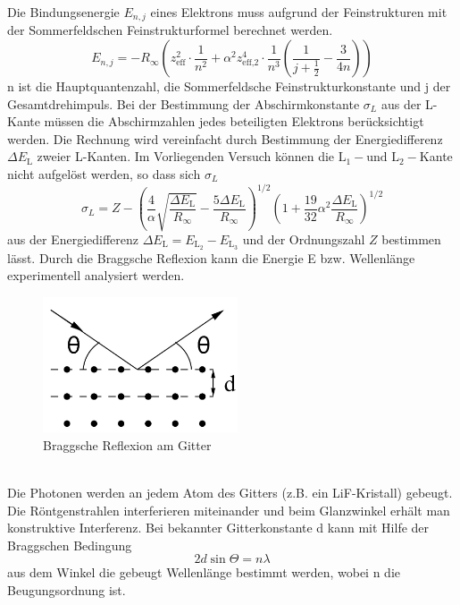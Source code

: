 \noindent
Die Bindungsenergie $E_{n,j}$ eines Elektrons muss aufgrund der Feinstrukturen mit der Sommerfeldschen Feinstrukturformel berechnet werden.
\begin{equation}
    E_{n,j} = -R_{\infty}\left(z_{\text{eff}}^2 \cdot \frac{1}{n^2} + \alpha^2 z_{\text{eff,2}}^4 \cdot \frac{1}{n^3} \left( \frac{1}{j + \frac{1}{2}} - \frac{3}{4n}\right)\right)
    \label{eqn:gl3}
\end{equation}
n ist die Hauptquantenzahl, \alpha die Sommerfeldsche Feinstrukturkonstante und j der Gesamtdrehimpuls.
Bei der Bestimmung der Abschirmkonstante ${\sigma}_L$ aus der L-Kante müssen die Abschirmzahlen jedes beteiligten Elektrons berücksichtigt werden.
Die Rechnung wird vereinfacht durch Bestimmung der Energiedifferenz $\Delta E_{\text{L}}$ zweier L-Kanten.
Im Vorliegenden Versuch können die $\text{L}_1- \text{und L}_2-$Kante nicht aufgelöst werden, so dass sich ${\sigma}_L$
\begin{equation}
    {\sigma}_L = Z - \left(\frac{4}{\alpha}\sqrt{\frac{\Delta E_{\text{L}}}{R_{\infty}}} - \frac{5 \Delta E_{\text{L}}}{R_{\infty}}\right)^{1/2}\left(1 + \frac{19}{32}\alpha^2\frac{\Delta E_{\text{L}}}{R_{\infty}}\right)^{1/2}
    \label{eqn:gl4}
\end{equation}
aus der Energiedifferenz $\Delta E_{\text{L}} = E_{\text{$\text{L}_2$}} - E_{\text{$\text{L}_3$}}$ und der Ordnungszahl $Z$ bestimmen lässt.
Durch die Braggsche Reflexion kann die Energie E bzw. Wellenlänge \lambda experimentell analysiert werden.
\begin{figure}
    \centering
    \includegraphics[height=4.0cm]{data/abb3.jpg}
    \caption{Braggsche Reflexion am Gitter \cite{V602}}
    \label{fig:abb3}
\end{figure} \\
\noindent
Die Photonen werden an jedem Atom des Gitters (z.B. ein LiF-Kristall) gebeugt.
Die Röntgenstrahlen interferieren miteinander und beim Glanzwinkel \Theta erhält man konstruktive Interferenz.
Bei bekannter Gitterkonstante d kann mit Hilfe der Braggschen Bedingung
\begin{equation}
    2 d \sin{\Theta} = n \lambda
\end{equation}
aus dem Winkel \Theta die gebeugt Wellenlänge \lambda bestimmt werden, wobei n die Beugungsordnung ist.

